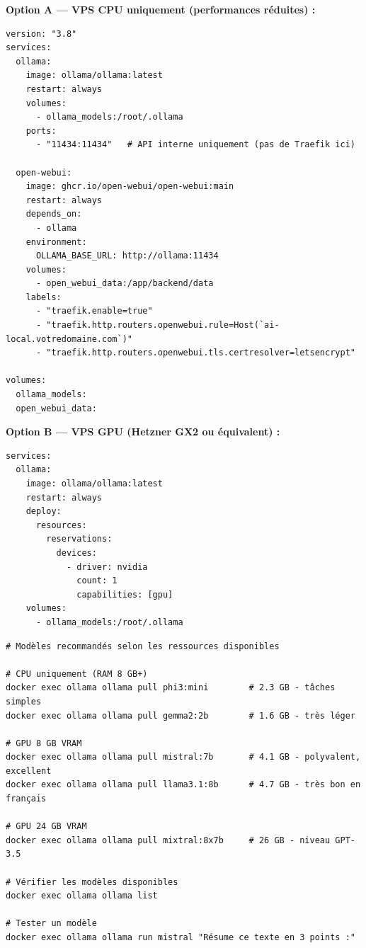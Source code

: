 \documentclass[11pt, a4paper]{article}
\begin{document}
\textbf{Option A — VPS CPU uniquement (performances réduites) :}
\begin{lstlisting}[style=yamlstyle, caption={docker-compose.yml — Ollama (CPU)}]
version: "3.8"
services:
  ollama:
    image: ollama/ollama:latest
    restart: always
    volumes:
      - ollama_models:/root/.ollama
    ports:
      - "11434:11434"   # API interne uniquement (pas de Traefik ici)

  open-webui:
    image: ghcr.io/open-webui/open-webui:main
    restart: always
    depends_on:
      - ollama
    environment:
      OLLAMA_BASE_URL: http://ollama:11434
    volumes:
      - open_webui_data:/app/backend/data
    labels:
      - "traefik.enable=true"
      - "traefik.http.routers.openwebui.rule=Host(`ai-local.votredomaine.com`)"
      - "traefik.http.routers.openwebui.tls.certresolver=letsencrypt"

volumes:
  ollama_models:
  open_webui_data:
\end{lstlisting}

\textbf{Option B — VPS GPU (Hetzner GX2 ou équivalent) :}
\begin{lstlisting}[style=yamlstyle, caption={docker-compose.yml — Ollama (GPU NVIDIA)}]
services:
  ollama:
    image: ollama/ollama:latest
    restart: always
    deploy:
      resources:
        reservations:
          devices:
            - driver: nvidia
              count: 1
              capabilities: [gpu]
    volumes:
      - ollama_models:/root/.ollama
\end{lstlisting}

\begin{lstlisting}[style=terminal, caption={Télécharger et lancer les modèles}]
# Modèles recommandés selon les ressources disponibles

# CPU uniquement (RAM 8 GB+)
docker exec ollama ollama pull phi3:mini        # 2.3 GB - tâches simples
docker exec ollama ollama pull gemma2:2b        # 1.6 GB - très léger

# GPU 8 GB VRAM
docker exec ollama ollama pull mistral:7b       # 4.1 GB - polyvalent, excellent
docker exec ollama ollama pull llama3.1:8b      # 4.7 GB - très bon en français

# GPU 24 GB VRAM
docker exec ollama ollama pull mixtral:8x7b     # 26 GB - niveau GPT-3.5

# Vérifier les modèles disponibles
docker exec ollama ollama list

# Tester un modèle
docker exec ollama ollama run mistral "Résume ce texte en 3 points :"
\end{lstlisting}
\end{document}
